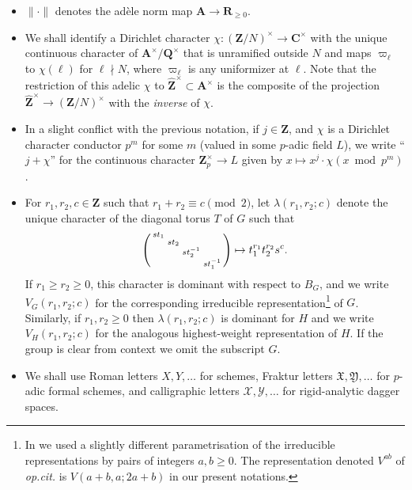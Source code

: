 \documentclass[cjm]{ipart}
\newenvironment{smatrix}{\left( \begin{smallmatrix} } {\end{smallmatrix} \right) }
\theoremstyle{plain}
\theoremstyle{remark}
\newcommand{\CC}{\mathbf{C}}
\newcommand{\QQ}{\mathbf{Q}}
\newcommand{\RR}{\mathbf{R}}
\newcommand{\ZZ}{\mathbf{Z}}
\newcommand{\Zp}{\mathbf{Z}_p}
\newcommand{\cX}{\mathcal{X}}
\newcommand{\cY}{\mathcal{Y}}
\renewcommand{\AA}{\mathbf{A}}
\numberwithin{equation}{subsection}
\renewcommand{\ge}{\geqslant}
\begin{document}
\begin{itemize}
 \item $\|\cdot\|$ denotes the ad\`ele norm map $\AA \to \RR_{\ge 0}$.
 
 \item We shall identify a Dirichlet character $\chi : (\ZZ / N)^\times \to \CC^\times$ with the  unique continuous character of $\AA^\times / \QQ^\times$ that is unramified outside $N$ and maps $\varpi_\ell$ to $\chi(\ell)$ for $\ell \nmid N$, where $\varpi_\ell$ is any uniformizer at $\ell$. Note that the restriction of this adelic $\chi$ to $\widehat{\ZZ}^\times \subset \AA^\times$ is the composite of the projection $\widehat{\ZZ}^\times \to (\ZZ / N)^\times$ with the \emph{inverse} of $\chi$.

 \item In a slight conflict with the previous notation, if $j \in \ZZ$, and $\chi$ is a Dirichlet character conductor $p^m$ for some $m$ (valued in some $p$-adic field $L$), we write ``$j + \chi$'' for the continuous character $\Zp^\times \to L$ given by $x \mapsto x^j \cdot \chi(x \bmod p^m)$.

 \item For $r_1, r_2, c \in \ZZ$ such that $r_1+r_2\equiv c\pmod 2$, let $\lambda(r_1,r_2;c)$ denote the unique character of the diagonal torus $T$ of $G$ such that
 \begin{equation}
  \label{eq:defweight}
  \begin{smatrix} st_1&&&\\&st_2 &&\\&&st_2^{-1} &\\  	&&& st_1^{-1}\end{smatrix}\mapsto t_1^{r_1}t_2^{r_2}s^c.
 \end{equation}
 If $r_1 \ge r_2 \ge 0$, this character is dominant with respect to $B_G$, and we write $V_G(r_1,r_2;c)$ for the corresponding irreducible representation\footnote{In \cite{LSZ17} we used a slightly different parametrisation of the irreducible representations by pairs of integers $a, b \ge 0$. The representation denoted $V^{ab}$ of \emph{op.cit.} is $V(a+b, a; 2a+b)$ in our present notations.} of $G$. Similarly, if $r_1, r_2 \ge 0$ then $\lambda(r_1, r_2; c)$ is dominant for $H$ and we write $V_H(r_1, r_2; c)$ for the analogous highest-weight representation of $H$. If the group is clear from context we omit the subscript $G$.

 \item We shall use Roman letters $X, Y, \dots$ for schemes, Fraktur letters $\mathfrak{X}, \mathfrak{Y}, \dots$ for $p$-adic formal schemes, and calligraphic letters $\cX, \cY, \dots$ for rigid-analytic dagger spaces.

\end{itemize}
\end{document}
